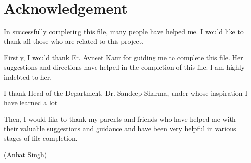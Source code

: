 \chapter*{Acknowledgement}

In successfully completing this file, many people have helped me. I would like to thank all those who are related to this project.

Firstly, I would thank Er. Avneet Kaur for guiding me to complete this file. Her suggestions and directions have helped in the completion of this file. I am highly indebted to her.

I thank Head of the Department, Dr. Sandeep Sharma, under whose inspiration I have learned a lot.

Then, I would like to thank my parents and friends who have helped me with their valuable suggestions and guidance and have been very helpful in various stages of file completion.
\vspace{2cm}

\begin{flushright}
(Anhat Singh)
\end{flushright}

\afterpage{\blankpage}